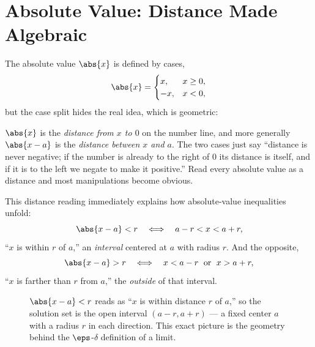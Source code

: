 \section{Absolute Value: Distance Made Algebraic}
\label{ch40:absolute-value}

The absolute value $\abs{x}$ is defined by cases,
\[
  \abs{x} = \begin{cases} x, & x \ge 0,\\ -x, & x < 0,\end{cases}
\]
but the case split hides the real idea, which is geometric:

\begin{intuitionbox}
$\abs{x}$ is the \emph{distance from $x$ to $0$} on the number line, and more
generally $\abs{x-a}$ is the \emph{distance between $x$ and $a$}. The two cases
just say ``distance is never negative; if the number is already to the right of
$0$ its distance is itself, and if it is to the left we negate to make it
positive.'' Read every absolute value as a distance and most manipulations become
obvious.
\end{intuitionbox}

This distance reading immediately explains how absolute-value inequalities unfold:
\[
  \abs{x-a} < r \quad\Longleftrightarrow\quad a - r < x < a + r,
\]
``$x$ is within $r$ of $a$,'' an \emph{interval} centered at $a$ with radius $r$.
And the opposite,
\[
  \abs{x-a} > r \quad\Longleftrightarrow\quad x < a-r \;\text{ or }\; x > a+r,
\]
``$x$ is farther than $r$ from $a$,'' the \emph{outside} of that interval.

\begin{figure}[H]
\centering
{}
\caption{$\abs{x-a}<r$ reads as ``$x$ is within distance $r$ of $a$,'' so the
solution set is the open interval $(a-r,a+r)$ --- a fixed center $a$ with a radius
$r$ in each direction. This exact picture is the geometry behind the
$\eps$-$\delta$ definition of a limit.}
\label{ch40:fig-absval}
\end{figure}

